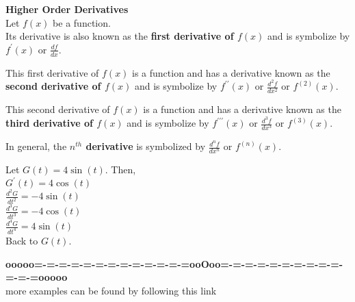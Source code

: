 \documentclass{ximera}
\begin{document}
\begin{definition} \textbf{\textcolor{green!50!black}{Higher Order Derivatives}} \\


Let $f(x)$ be a function. \\


Its derivative is also known as the \textbf{first derivative of $f(x)$} and is symbolize by \textbf{$f^{\prime}(x)$} or \textbf{$\frac{df}{dx}$}.

This first derivative of $f(x)$ is a function and has a derivative known as the \textbf{second derivative of $f(x)$} and is symbolize by \textbf{$f^{\prime\prime}(x)$} or \textbf{$\frac{d^2f}{dx^2}$} or \textbf{$f^{(2)}(x)$}.


This second derivative of $f(x)$ is a function and has a derivative known as the \textbf{third derivative of $f(x)$} and is symbolize by \textbf{$f^{\prime\prime\prime}(x)$} or \textbf{$\frac{d^3f}{dx^3}$} or \textbf{$f^{(3)}(x)$}.


In general, the \textbf{$n^{th}$ derivative} is symbolized by \textbf{$\frac{d^{n}f}{dx^n}$} or \textbf{$f^{(n)}(x)$}.


\end{definition}




\begin{example}


Let $G(t) = 4 \sin(t)$. Then,\\

$G^{\prime}(t) = 4 \cos(t)$ \\

$\frac{d^{2}G}{dt^{2}} = -4 \sin(t)$ \\

$\frac{d^{3}G}{dt^{3}} = -4 \cos(t)$ \\

$\frac{d^{4}G}{dt^{4}} = 4 \sin(t)$ \\

Back to $G(t)$.

\end{example}








\begin{center}
\textbf{\textcolor{green!50!black}{ooooo=-=-=-=-=-=-=-=-=-=-=-=-=ooOoo=-=-=-=-=-=-=-=-=-=-=-=-=ooooo}} \\

more examples can be found by following this link\\ 

\end{center}
\end{document}
